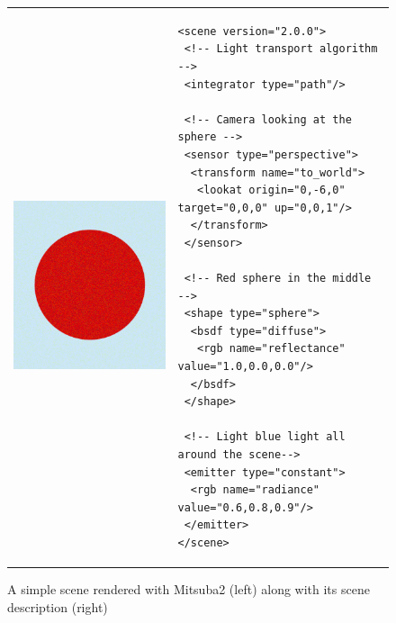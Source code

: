 \begin{figure}[httpb]
\begin{tabular}{p{}p{}}
\begin{minipage}{0.3\textwidth}
	\includegraphics[width=\linewidth]{img/example_scene.png}
\end{minipage}
	&
\begin{minipage}{0.6\textwidth}
	\lstset{language=XML}
	\begin{lstlisting}[basicstyle=\tiny]
<scene version="2.0.0">
 <!-- Light transport algorithm -->
 <integrator type="path"/>
	
 <!-- Camera looking at the sphere -->
 <sensor type="perspective">
  <transform name="to_world">
   <lookat origin="0,-6,0" target="0,0,0" up="0,0,1"/>
  </transform>
 </sensor>
	
 <!-- Red sphere in the middle -->
 <shape type="sphere">
  <bsdf type="diffuse">
   <rgb name="reflectance" value="1.0,0.0,0.0"/>
  </bsdf>
 </shape>
	
 <!-- Light blue light all around the scene-->
 <emitter type="constant">
  <rgb name="radiance" value="0.6,0.8,0.9"/>
 </emitter>
</scene>
	\end{lstlisting}
\end{minipage}
\end{tabular}
\caption{A simple scene rendered with Mitsuba2 (left) along with its scene description (right)}
\label{fig:example_scene}
\end{figure}

